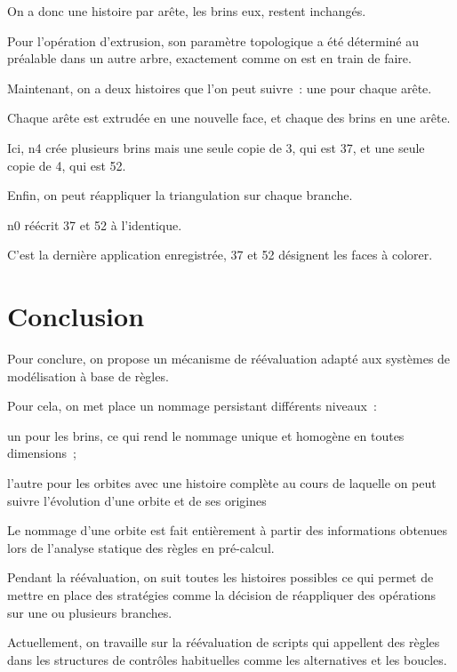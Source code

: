 \documentclass[11pt]{article}
\begin{document}
On a donc une histoire par arête, les brins eux, restent inchangés.

Pour l'opération d'extrusion, son paramètre topologique a été déterminé au
préalable dans un autre arbre, exactement comme on est en train de faire.

Maintenant, on a deux histoires que l'on peut suivre~: une pour chaque arête.

Chaque arête est extrudée en une nouvelle face, et chaque des brins en une
arête.

Ici, n4 crée plusieurs brins mais une seule copie de 3, qui est 37, et une seule
copie de 4, qui est 52.

Enfin, on peut réappliquer la triangulation sur chaque branche.

n0 réécrit 37 et 52 à l'identique.

C'est la dernière application enregistrée, 37 et 52 désignent les faces à colorer.

\section{Conclusion}
\label{sec:orga7a7cfd}

Pour conclure, on propose un mécanisme de réévaluation adapté aux systèmes de
modélisation à base de règles.

Pour cela, on met place un nommage persistant différents niveaux~:

un pour les brins, ce qui rend le nommage unique et homogène en toutes
dimensions~;

l'autre pour les orbites avec une histoire complète au cours de laquelle on peut
suivre l'évolution d'une orbite et de ses origines

Le nommage d'une orbite est fait entièrement à partir des informations obtenues lors de
l'analyse statique des règles en pré-calcul.

Pendant la réévaluation, on suit toutes les histoires possibles ce qui permet de
mettre en place des stratégies comme la décision de réappliquer des opérations
sur une ou plusieurs branches.

Actuellement, on travaille sur la réévaluation de scripts qui appellent des
règles dans les structures de contrôles habituelles comme les alternatives et
les boucles.
\end{document}
